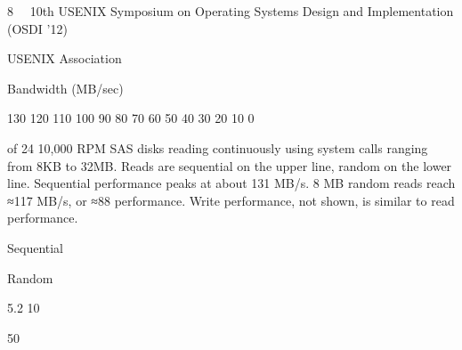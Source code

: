 8  10th USENIX Symposium on Operating Systems Design and Implementation (OSDI ’12)  

USENIX Association


Bandwidth (MB/sec)

130
120
110
100
90
80
70
60
50
40
30
20
10
0

of 24 10,000 RPM SAS disks reading continuously using system calls ranging from 8KB to 32MB. Reads are
sequential on the upper line, random on the lower line.
Sequential performance peaks at about 131 MB/s. 8 MB
random reads reach ≈117 MB/s, or ≈88%
performance. Write performance, not shown, is similar
to read performance.

Sequential

Random

5.2
10

50

